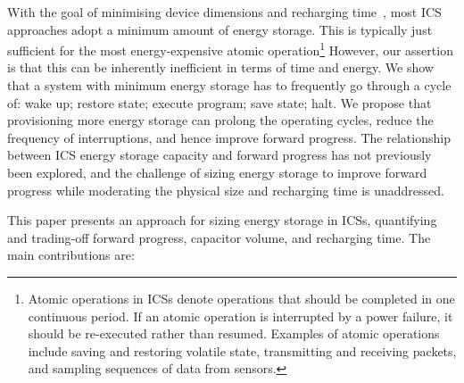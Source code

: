 With the goal of minimising device dimensions and recharging time~\cite{6960060, 6733152, 10.1145/2809695.2809707, 10.1145/3281300, 222579}, most ICS approaches adopt a minimum amount of energy storage. This is typically just sufficient for the most energy-expensive atomic operation\footnote{Atomic operations in ICSs denote operations that should be completed in one continuous period. If an atomic operation is interrupted by a power failure, it should be re-executed rather than resumed. Examples of atomic operations include saving and restoring volatile state, transmitting and receiving packets, and sampling sequences of data from sensors.}
However, our assertion is that this can be inherently inefficient in terms of time and energy. We show that a system with minimum energy storage has to frequently go through a cycle of: wake up; restore state; execute program; save state; halt. We propose that provisioning more energy storage can prolong the operating cycles, reduce the frequency of interruptions, and hence improve forward progress. 
The relationship between ICS energy storage capacity and forward progress has not previously been explored, and the challenge of sizing energy storage to improve forward progress while moderating the physical size and recharging time is unaddressed. 

This paper presents an approach for sizing energy storage in ICSs, quantifying and trading-off forward progress, capacitor volume, and recharging time. 
The main contributions are: 

